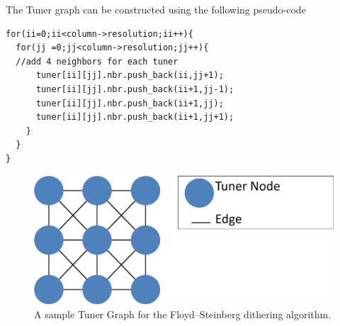 \documentclass[annual]{acmsiggraph}
\begin{document}
The Tuner graph can be constructed using the following pseudo-code
\begin{verbatim}
for(ii=0;ii<column->resolution;ii++){
  for(jj =0;jj<column->resolution;jj++){
  //add 4 neighbors for each tuner
      tuner[ii][jj].nbr.push_back(ii,jj+1);
      tuner[ii][jj].nbr.push_back(ii+1,jj-1);
      tuner[ii][jj].nbr.push_back(ii+1,jj);
      tuner[ii][jj].nbr.push_back(ii+1,jj+1);
    }
  }
}
\end{verbatim}

\begin{figure}[h]
\includegraphics[scale=0.3]{figure/tuner.pdf}
\caption{A sample Tuner Graph for the Floyd–Steinberg dithering algorithm.}
\label{fig:tuner}
\end{figure}
\end{document}
